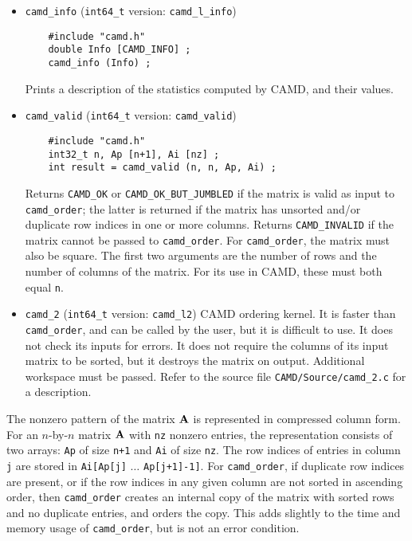 \documentclass[11pt]{article}
\newcommand{\m}[1]{{\bf{#1}}}       %
\begin{document}
\begin{itemize}
\item {\tt camd\_info}
(\verb'int64_t' version: {\tt camd\_l\_info})
    {\footnotesize
    \begin{verbatim}
    #include "camd.h"
    double Info [CAMD_INFO] ;
    camd_info (Info) ;
    \end{verbatim}
    }
    Prints a description of the statistics computed by CAMD, and their values.

\item {\tt camd\_valid}
(\verb'int64_t' version: {\tt camd\_valid})
    {\footnotesize
    \begin{verbatim}
    #include "camd.h"
    int32_t n, Ap [n+1], Ai [nz] ;
    int result = camd_valid (n, n, Ap, Ai) ;
    \end{verbatim}
    }
    Returns {\tt CAMD\_OK} or {\tt CAMD\_OK\_BUT\_JUMBLED}
    if the matrix is valid as input to {\tt camd\_order};
    the latter is returned if the matrix has unsorted and/or duplicate
    row indices in one or more columns. 
    Returns {\tt CAMD\_INVALID} if the matrix cannot be passed to
    {\tt camd\_order}.
    For {\tt camd\_order}, the matrix must
    also be square.  The first two arguments are the number of rows and the
    number of columns of the matrix.  For its use in CAMD, these must both
    equal {\tt n}.

\item {\tt camd\_2}
(\verb'int64_t' version: {\tt camd\_l2})
    CAMD ordering kernel.  It is faster than {\tt camd\_order}, and
    can be called by the user, but it is difficult to use.
    It does not check its inputs for errors.
    It does not require the columns of its input matrix to be sorted,
    but it destroys the matrix on output.  Additional workspace must be passed.
    Refer to the source file {\tt CAMD/Source/camd\_2.c} for a description.

\end{itemize}

The nonzero pattern of the matrix $\m{A}$ is represented in compressed column
form.
For an $n$-by-$n$ matrix $\m{A}$ with {\tt nz} nonzero entries, the
representation consists of two arrays: {\tt Ap} of size {\tt n+1} and {\tt Ai}
of size {\tt nz}.  The row indices of entries in column {\tt j} are stored in
    {\tt Ai[Ap[j]} $\ldots$ {\tt Ap[j+1]-1]}.
For {\tt camd\_order},
if duplicate row indices are present, or if the row indices in any given
column are not sorted in ascending order, then {\tt camd\_order} creates
an internal copy of the matrix with sorted rows and no duplicate entries,
and orders the copy.  This adds slightly to the time and memory usage of
{\tt camd\_order}, but is not an error condition.
\end{document}
